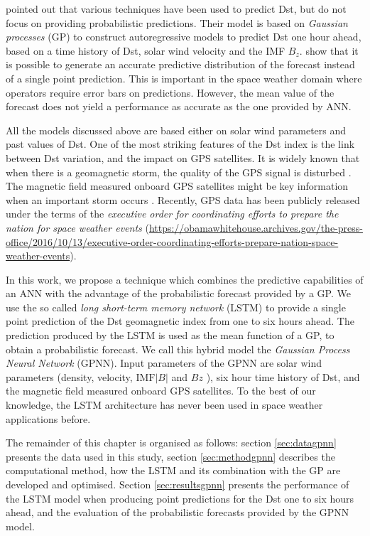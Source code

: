\citet{ChandorkarDst} pointed out that various techniques have been used to predict Dst, but do not 
focus on providing probabilistic predictions. Their model is based on \emph{Gaussian processes} (GP) to construct 
autoregressive models to predict Dst one hour ahead, based on a time history of Dst, solar wind velocity and 
the IMF $B_z$. \citet{ChandorkarDst} show that it is possible to generate an accurate predictive distribution 
of the forecast instead of a single point prediction. This is important in the space weather domain where 
operators require error bars on predictions. However, the mean value of the forecast does not yield a 
performance as accurate as the one provided by ANN. 

All the models discussed above are based either on solar wind parameters and past values of Dst. One of the most 
striking features of the Dst index is the link between Dst variation, and the impact on GPS satellites. 
It is widely known that when there is a geomagnetic storm, the quality of the GPS signal is disturbed 
\citep{astafyeva2014geomagnetic}. The magnetic field measured onboard GPS satellites might be key information 
when an important storm occurs \citep{morley2017energetic}. Recently, GPS data has been publicly released under 
the terms of the \emph{executive order for coordinating efforts to prepare the nation for space weather events} 
(\url{https://obamawhitehouse.archives.gov/the-press-office/2016/10/13/executive-order-coordinating-efforts-prepare-nation-space-weather-events}). 

In this work, we propose a technique which combines the predictive capabilities of an ANN with the advantage of the 
probabilistic forecast provided by a GP. We use the so called \emph{long short-term memory network} (LSTM) 
\citep{hochreiter1997long} to provide a single point prediction of the Dst geomagnetic index from one to six 
hours ahead. The prediction produced by the LSTM is used as the mean function of a GP, to obtain a 
probabilistic forecast. We call this hybrid model the \emph{Gaussian Process Neural Network} (GPNN). 
Input parameters of the GPNN are solar wind parameters (density, velocity,  
$\text{IMF}\vert B \vert$  and $Bz$ ), six hour time history of Dst, and the magnetic field 
measured onboard GPS satellites. To the best of our knowledge, the LSTM architecture has never 
been used in space weather applications before.

The remainder of this chapter is organised as follows: section \ref{sec:datagpnn} presents the data used in this study, 
section \ref{sec:methodgpnn} describes the computational method, how the LSTM and its combination with the GP are 
developed and optimised. Section \ref{sec:resultsgpnn} presents the performance of the LSTM model when producing 
point predictions for the Dst one to six hours ahead, and the evaluation of the probabilistic forecasts provided 
by the GPNN model. 

